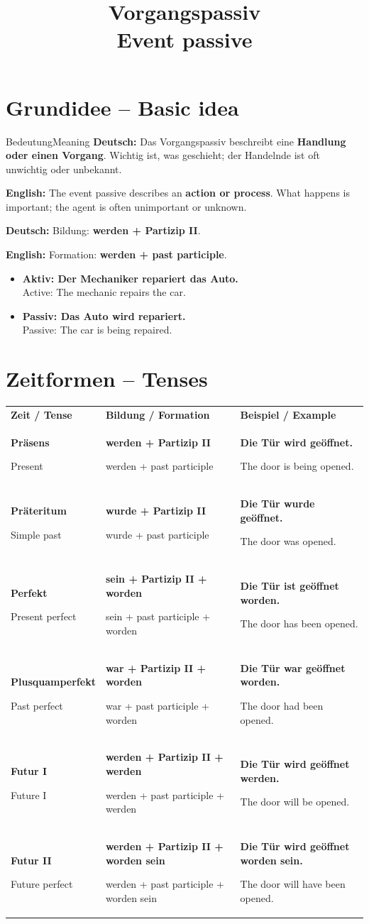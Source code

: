 \documentclass[a4paper,11pt]{article}
\title{Vorgangspassiv\\[0.3em]\large\textnormal{Event passive}}
\date{}
\newcommand{\GermanText}[1]{\textbf{Deutsch: }#1\par}
\newcommand{\EnglishText}[1]{{\small\color{SoftGray}\textbf{English: }#1\par}}
\newcommand{\ExampleItem}[2]{\item \textbf{#1}\\{\small\color{SoftGray}#2}}
\newcommand{\DEEN}[2]{\textbf{#1}\par{\footnotesize\color{SoftGray}#2}}
\begin{document}
\maketitle
\tableofcontents
\newpage

\section{Grundidee -- Basic idea}
\begin{grammarentry}{Bedeutung}{Meaning}
\GermanText{Das Vorgangspassiv beschreibt eine \textbf{Handlung oder einen Vorgang}. Wichtig ist, was geschieht; der Handelnde ist oft unwichtig oder unbekannt.}
\EnglishText{The event passive describes an \textbf{action or process}. What happens is important; the agent is often unimportant or unknown.}
\GermanText{Bildung: \textbf{werden + Partizip II}.}
\EnglishText{Formation: \textbf{werden + past participle}.}
\end{grammarentry}
\begin{exbox}\begin{itemize}
\ExampleItem{Aktiv: Der Mechaniker repariert das Auto.}{Active: The mechanic repairs the car.}
\ExampleItem{Passiv: Das Auto wird repariert.}{Passive: The car is being repaired.}
\end{itemize}\end{exbox}

\section{Zeitformen -- Tenses}
\begin{longtable}{>{\bfseries}p{3.0cm}|p{5.2cm}|p{5.6cm}}
\rowcolor{HeaderBlueDark}\color{white}\textbf{Zeit / Tense}&\color{white}\textbf{Bildung / Formation}&\color{white}\textbf{Beispiel / Example}\\
\DEEN{Präsens}{Present}&\DEEN{werden + Partizip II}{werden + past participle}&\DEEN{Die Tür wird geöffnet.}{The door is being opened.}\\
\DEEN{Präteritum}{Simple past}&\DEEN{wurde + Partizip II}{wurde + past participle}&\DEEN{Die Tür wurde geöffnet.}{The door was opened.}\\
\DEEN{Perfekt}{Present perfect}&\DEEN{sein + Partizip II + worden}{sein + past participle + worden}&\DEEN{Die Tür ist geöffnet worden.}{The door has been opened.}\\
\DEEN{Plusquamperfekt}{Past perfect}&\DEEN{war + Partizip II + worden}{war + past participle + worden}&\DEEN{Die Tür war geöffnet worden.}{The door had been opened.}\\
\DEEN{Futur I}{Future I}&\DEEN{werden + Partizip II + werden}{werden + past participle + werden}&\DEEN{Die Tür wird geöffnet werden.}{The door will be opened.}\\
\DEEN{Futur II}{Future perfect}&\DEEN{werden + Partizip II + worden sein}{werden + past participle + worden sein}&\DEEN{Die Tür wird geöffnet worden sein.}{The door will have been opened.}\\
\end{longtable}
\end{document}
